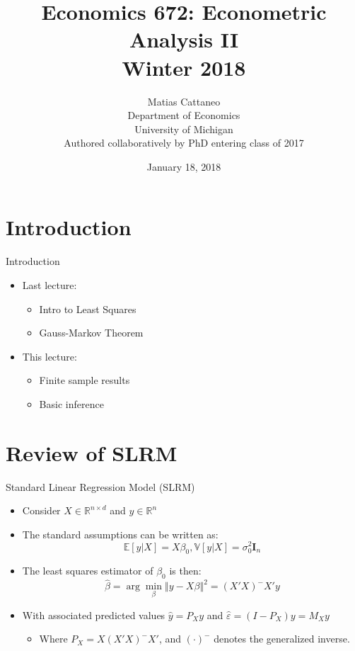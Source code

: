 \documentclass[fleqn, 10pt]{beamer}
\title[Econ-672]{Economics 672: Econometric Analysis II \\ Winter 2018}
\author[M. Cattaneo]{Matias Cattaneo \\
        Department of Economics \\
        University of Michigan \\
        Authored collaboratively by PhD entering class of 2017
        }
\date{January 18, 2018}
\newcommand{\E}{\mathbb{E}}
\newcommand{\V}{\mathbb{V}}
\begin{document}


\begin{frame}[plain]
    \titlepage
\end{frame}


\section{Introduction}

\begin{frame}{Introduction}
    \begin{itemize}
		\item Last lecture:
	    \begin{itemize}
			\item Intro to Least Squares
			\item Gauss-Markov Theorem
		\end{itemize}
		\item This lecture:
		\begin{itemize}
			\item Finite sample results
			\item Basic inference
		\end{itemize}
	\end{itemize}
\end{frame}


\section{Review of SLRM}

\begin{frame}{Standard Linear Regression Model (SLRM)}

    \begin{itemize}
    	\item Consider \( X \in \mathbb{R}^{n\times d} \) and \( y \in \mathbb{R}^{n} \)
		\item The standard assumptions can be written as:
		\[ \E[y|X] = X \beta_0, \V[y|X] = \sigma_0^2 \mathbf{I}_n \]
		\item The least squares estimator of \(\beta_0\) is then:
		\[ \hat{\beta} = \arg\min_{\beta} \left\Vert y - X \beta \right\Vert^2 = (X'X)^{-}X'y \]
		\item With associated predicted values \( \hat{y} = P_{X} y \) and \( \hat{\varepsilon} = (I - P_{X})y = M_{X} y \)
		\begin{itemize}
			\item Where \( P_{X} = X(X'X)^{-}X' \), and \((\cdot)^-\) denotes the generalized inverse.
		\end{itemize}
	\end{itemize}
	
\end{frame}
\end{document}
